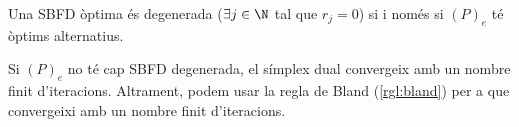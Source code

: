 \begin{prop}
    Una SBFD òptima és degenerada ($\exists j \in \N$ tal que $r_j = 0$) si i només si $\left(P\right)_e$ té òptims alternatius.
\end{prop}

\begin{prop}
    Si $\left(P\right)_e$ no té cap SBFD degenerada, el símplex dual convergeix amb un nombre finit d'iteracions. Altrament, podem usar la regla de Bland (\ref{rgl:bland}) per a que convergeixi amb un nombre finit d'iteracions.
\end{prop}